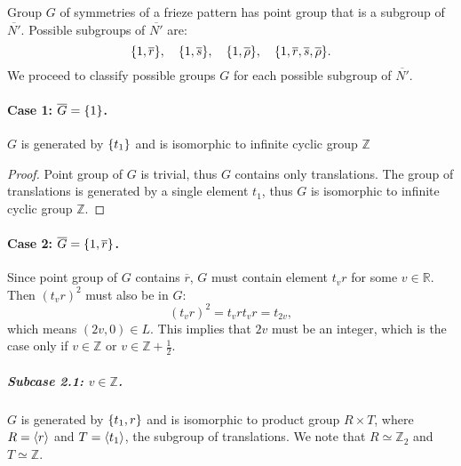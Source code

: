 \documentclass{article}
\theoremstyle{definition}
\newcommand{\R}{\mathbb{R}}
\newcommand{\Z}{\mathbb{Z}}
\DeclarePairedDelimiter\set{\{}{\}}
\DeclarePairedDelimiter\genby{\langle}{\rangle}
\begin{document}
Group $G$ of symmetries of a frieze pattern has point group that is a subgroup of $\overline{N'}$.
Possible subgroups of $\overline{N'}$ are:
\[
    \set{1, \overline{r}}, \quad
    \set{1, \overline{s}}, \quad
    \set{1, \overline{\rho}}, \quad
    \set{1, \overline{r}, \overline{s}, \overline{\rho}}.
\]
We proceed to classify possible groups $G$ for each possible subgroup of $\overline{N'}$.

\paragraph{Case 1: $\overline{G} = \set{1}$.}
$G$ is generated by $\set{t_1}$ and is isomorphic to infinite cyclic group $\Z$

\begin{proof}
Point group of $G$ is trivial, thus $G$ contains only translations.
The group of translations is generated by a single element $t_1$, thus $G$ is isomorphic to infinite cyclic group $\Z$.
\end{proof}

\paragraph{Case 2: $\overline{G} = \set{1, \overline{r}}$.}

Since point group of $G$ contains $\overline{r}$, $G$ must contain element $t_v r$ for some $v \in \R$.
Then $(t_v r)^2$ must also be in $G$:
\[ (t_v r)^2 = t_v r t_v r = t_{2v}, \]
which means $(2v,0) \in L$.
This implies that $2v$ must be an integer, which is the case only if $v \in \Z$ or $v \in \Z + \frac{1}{2}$.

\subparagraph{Subcase 2.1: $v \in \Z$.}
$G$ is generated by $\set{t_1, r}$ and is isomorphic to product group $R \times T$, where $R = \genby{r}$ and $T = \genby{t_1}$, the subgroup of translations.
We note that $R \simeq \Z_2$ and $T \simeq \Z$.
\end{document}
